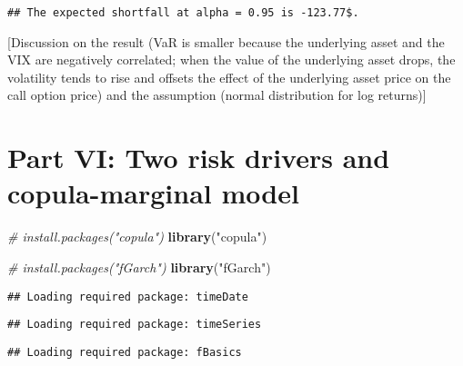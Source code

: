 \documentclass[]{article}
\newenvironment{Shaded}{\begin{snugshade}}{\end{snugshade}}
\newcommand{\CommentTok}[1]{\textcolor[rgb]{0.56,0.35,0.01}{\textit{#1}}}
\newcommand{\KeywordTok}[1]{\textcolor[rgb]{0.13,0.29,0.53}{\textbf{#1}}}
\newcommand{\NormalTok}[1]{#1}
\newcommand{\StringTok}[1]{\textcolor[rgb]{0.31,0.60,0.02}{#1}}
\begin{document}
\begin{verbatim}
## The expected shortfall at alpha = 0.95 is -123.77$.
\end{verbatim}

{[}Discussion on the result (VaR is smaller because the underlying asset
and the VIX are negatively correlated; when the value of the underlying
asset drops, the volatility tends to rise and offsets the effect of the
underlying asset price on the call option price) and the assumption
(normal distribution for log returns){]}

\hypertarget{part-vi-two-risk-drivers-and-copula-marginal-model}{%
\section{Part VI: Two risk drivers and copula-marginal
model}\label{part-vi-two-risk-drivers-and-copula-marginal-model}}

\begin{Shaded}
\begin{Highlighting}[]
\CommentTok{# install.packages("copula")}
\KeywordTok{library}\NormalTok{(}\StringTok{"copula"}\NormalTok{)}

\CommentTok{# install.packages("fGarch")}
\KeywordTok{library}\NormalTok{(}\StringTok{"fGarch"}\NormalTok{)}
\end{Highlighting}
\end{Shaded}

\begin{verbatim}
## Loading required package: timeDate
\end{verbatim}

\begin{verbatim}
## Loading required package: timeSeries
\end{verbatim}

\begin{verbatim}
## Loading required package: fBasics
\end{verbatim}
\end{document}
